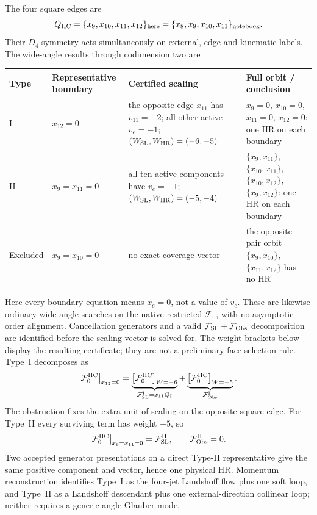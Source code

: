 \documentclass[a4paper,11pt]{article}
\newcommand{\FSL}{\mathcal F_{\rm SL}}
\newcommand{\FObs}{\mathcal F_{\rm Obs}}
\newcommand{\WSL}{W_{\rm SL}}
\newcommand{\WHR}{W_{\rm HR}}
\begin{document}
The four square edges are
\begin{equation}
 Q_{\rm HC}=\{x_9,x_{10},x_{11},x_{12}\}_{\rm here}
 =\{x_8,x_9,x_{10},x_{11}\}_{\rm notebook}.
\end{equation}
Their \(D_4\) symmetry acts simultaneously on external, edge and kinematic
labels.  The wide-angle results through codimension two are
\begin{center}
\small
\begin{tabular}{@{}
 >{\raggedright\arraybackslash}p{}
 >{\raggedright\arraybackslash}p{}
 >{\raggedright\arraybackslash}p{}
 >{\raggedright\arraybackslash}p{}@{}}
\toprule
Type & Representative boundary & Certified scaling & Full orbit / conclusion\\
\midrule
I & \(x_{12}=0\) & the opposite edge \(x_{11}\) has \(v_{11}=-2\);
all other active \(v_e=-1\); \((\WSL,\WHR)=(-6,-5)\)
& \(x_9=0\), \(x_{10}=0\), \(x_{11}=0\), \(x_{12}=0\): one HR on each boundary\\[1mm]
II & \(x_9=x_{11}=0\) & all ten active components have \(v_e=-1\);
\((\WSL,\WHR)=(-5,-4)\)
& \(\{x_9,x_{11}\}\), \(\{x_{10},x_{11}\}\),
\(\{x_{10},x_{12}\}\), \(\{x_9,x_{12}\}\): one HR on each boundary\\[1mm]
Excluded & \(x_9=x_{10}=0\) & no exact coverage vector & the opposite-pair
orbit \(\{x_9,x_{10}\}\), \(\{x_{11},x_{12}\}\) has no HR\\
\bottomrule
\end{tabular}
\end{center}
Here every boundary equation means \(x_e=0\), not a value of \(v_e\).
These are likewise ordinary wide-angle searches on the native restricted
\(\mathcal F_0\), with no asymptotic-order alignment.  Cancellation
generators and a valid \(\FSL+\FObs\) decomposition are identified before the
scaling vector is solved for.  The weight brackets below display the resulting
certificate; they are not a preliminary face-selection rule.
Type~I decomposes as
\begin{equation}
 \left.\mathcal F_0^{\rm HC}\right|_{x_{12}=0}
 =\underbrace{\left[\mathcal F_0^{\rm HC}\right]_{W=-6}}_
   {\mathcal F_{\rm SL}^{\rm I}=x_{11}Q_{\rm I}}
 +\underbrace{\left[\mathcal F_0^{\rm HC}\right]_{W=-5}}_
   {\mathcal F_{\rm Obs}^{\rm I}}.
 \label{eq:HC-type-I-decomposition}
\end{equation}
The obstruction fixes the extra unit of scaling on the opposite square edge.
For Type~II every surviving term has weight \(-5\), so
\begin{equation}
 \left.\mathcal F_0^{\rm HC}\right|_{x_9=x_{11}=0}
 =\mathcal F_{\rm SL}^{\rm II},
 \qquad \mathcal F_{\rm Obs}^{\rm II}=0.
\end{equation}
Two accepted generator presentations on a direct Type-II representative give
the same positive component and vector, hence one physical HR.  Momentum
reconstruction identifies Type~I as the four-jet Landshoff flow plus one soft
loop, and Type~II as a Landshoff descendant plus one external-direction
collinear loop; neither requires a generic-angle Glauber mode.
\end{document}
